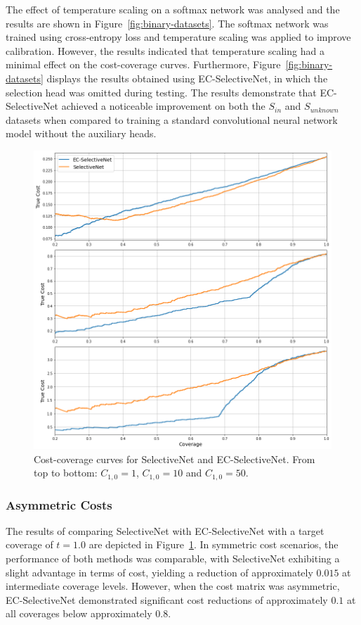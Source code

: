 The effect of temperature scaling on a softmax network was analysed and the results are shown in Figure~\ref{fig:binary-datasets}. The softmax network was trained using cross-entropy loss and temperature scaling was applied to improve calibration. However, the results indicated that temperature scaling had a minimal effect on the cost-coverage curves. Furthermore, Figure~\ref{fig:binary-datasets} displays the results obtained using EC-SelectiveNet, in which the selection head was omitted during testing. The results demonstrate that EC-SelectiveNet achieved a noticeable improvement on both the $S_{in}$ and $S_{unknown}$ datasets when compared to training a standard convolutional neural network model without the auxiliary heads.

\begin{figure}[!h]
	\centering
	\includegraphics[width=\textwidth]{images/binary_ecselectivenet.png}
	\caption{Cost-coverage curves for SelectiveNet and EC-SelectiveNet. From top to bottom: $C_{1,0}=1$, $C_{1,0}=10$ and $C_{1,0}=50$.}
	\label{fig:binary-ecselectivenet}
\end{figure}

\subsubsection{Asymmetric Costs}
The results of comparing SelectiveNet with EC-SelectiveNet with a target coverage of $t=1.0$ are depicted in Figure~\ref{fig:binary-ecselectivenet}. In symmetric cost scenarios, the performance of both methods was comparable, with SelectiveNet exhibiting a slight advantage in terms of cost, yielding a reduction of approximately $0.015$ at intermediate coverage levels. However, when the cost matrix was asymmetric, EC-SelectiveNet demonstrated significant cost reductions of approximately $0.1$ at all coverages below approximately $0.8$.

